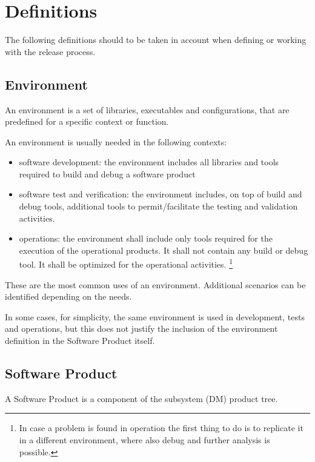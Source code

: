 \section{Definitions} \label{sec:defs}

The following definitions should to be taken in account when defining or working with the release process.


\subsection{Environment} \label{sec:envdef}

An environment is a set of libraries, executables and configurations, that are predefined for a specific context or function.

An environment is usually needed in the following contexts:

\begin{itemize}
\item software development: the environment includes all libraries and tools required to build and debug a software product
\item software test and verification: the environment includes, on top of build and debug tools, additional tools to permit/facilitate the testing and validation activities.
\item operations: the environment shall include only tools required for the execution of the operational products. It shall not contain any build or debug tool. It shall be optimized for the operational activities. \footnote{In case a problem is found in operation the first thing to do is to replicate it in a different environment, where also debug and further analysis is possible.}
\end{itemize}

These are the most common uses of an environment. Additional scenarios can be identified depending on the needs.

In some cases, for simplicity, the same environment is used in development, tests and operations, but this does not justify the inclusion of the environment definition in the Software Product itself.


\subsection{Software Product} \label{sec:swdef}

A Software Product is a component of the subsystem (\gls{DM}) product tree.

